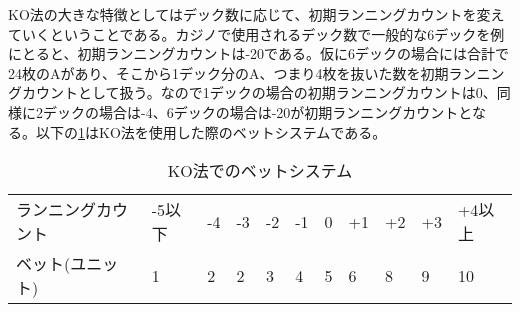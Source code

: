 KO法の大きな特徴としてはデック数に応じて、初期ランニングカウントを変えていくということである。カジノで使用されるデック数で一般的な6デックを例にとると、初期ランニングカウントは-20である。仮に6デックの場合には合計で24枚のAがあり、そこから1デック分のA、つまり4枚を抜いた数を初期ランニングカウントとして扱う。なので1デックの場合の初期ランニングカウントは0、同様に2デックの場合は-4、6デックの場合は-20が初期ランニングカウントとなる。以下の\ref{kob}はKO法を使用した際のベットシステムである。
\begin{table}[H]
\begin{tabular}{lllllllllll}
ランニングカウント&-5以下&-4&-3&-2&-1&0&+1&+2&+3&+4以上 \\
ベット(ユニット)&1&2&2&3&4&5&6&8&9&10 \\
\end{tabular}
\caption{KO法でのベットシステム}
\label{kob}
\end{table}
